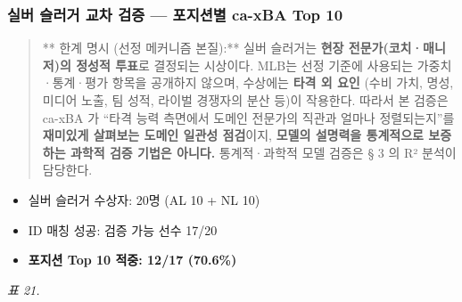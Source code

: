 \documentclass[
  11.5pt,
]{article}
\providecommand{\tightlist}{%
  \setlength{\itemsep}{0pt}\setlength{\parskip}{0pt}}
\begin{document}
\subsubsection{실버 슬러거 교차 검증 --- 포지션별 ca-xBA Top
10}\label{uxc2e4uxbc84-uxc2acuxb7ecuxac70-uxad50uxcc28-uxac80uxc99d-uxd3ecuxc9c0uxc158uxbcc4-ca-xba-top-10}

\begin{quote}
** 한계 명시 (선정 메커니즘 본질):** 실버 슬러거는 \textbf{현장
전문가(코치·매니저)의 정성적 투표}로 결정되는 시상이다. MLB는 선정
기준에 사용되는 가중치·통계·평가 항목을 공개하지 않으며, 수상에는
\textbf{타격 외 요인} (수비 가치, 명성, 미디어 노출, 팀 성적, 라이벌
경쟁자의 분산 등)이 작용한다. 따라서 본 검증은 ca-xBA 가 ``타격 능력
측면에서 도메인 전문가의 직관과 얼마나 정렬되는지''를 \textbf{재미있게
살펴보는 도메인 일관성 점검}이지, \textbf{모델의 설명력을 통계적으로
보증하는 과학적 검증 기법은 아니다.} 통계적·과학적 모델 검증은 § 3 의 R²
분석이 담당한다.
\end{quote}

\begin{itemize}
\tightlist
\item
  실버 슬러거 수상자: 20명 (AL 10 + NL 10)
\item
  ID 매칭 성공: 검증 가능 선수 17/20
\item
  \textbf{포지션 Top 10 적중: 12/17 (70.6\%)}
\end{itemize}

\emph{표 21.}
\end{document}
